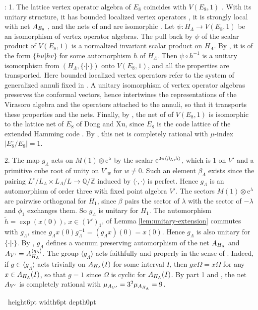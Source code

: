 \documentclass[leqno]{article}
\let\cal\relax
\newcommand{\cal}{\mathcal}
\newcommand{\Z}{\ensuremath{\mathbb{Z}}}
\newcommand{\qed}{\hfill \vrule height6pt  width6pt depth0pt}
\newcommand{\co}{\colon}
\newcommand{\ot}{\otimes}
\let\i\relax %
\newcommand{\i}{\mathrm{i}}
\newcommand{\e}{\mathrm{e}} %
\newenvironment{proof}[1][]{\noindent {\it Proof #1} : }{\hbox{~}\qed
\smallskip
}
\numberwithin{equation}{section}
\begin{document}
\begin{proof}
1. The lattice vertex operator algebra of $E_8$ coincides with $V(E_8,1)$ \cite[Proof of Theorem 7.4 p.~71]{Ten19a}. With its unitary structure, it has bounded localized vertex operators \cite[Theorem 7.4 p.~71]{Ten19a}, it is strongly local with net $\cal A_{E_8}$ \cite[Example 8.7 p.~63]{CKLW18}, and the nets of \cite{Ten19a} and \cite{CKLW18} are isomorphic \cite[Corollary 7.7 p.~72]{Ten19a}. Let $\psi \co H_\Lambda \to V(E_8,1)$ be an isomorphism of vertex operator algebras. The pull back by $\psi$ of the scalar product of $V(E_8,1)$ is a normalized invariant scalar product on $H_\Lambda$. By \cite[Proposition 5.19 p.~40]{CKLW18}, it is of the form $\{hu|hv\}$ for some automorphism $h$ of $H_\Lambda$. Then $\psi \circ h^{-1}$ is a unitary isomorphism from $(H_\Lambda,\{\cdot|\cdot\})$ onto $V(E_8,1)$, and all the properties are transported. Here bounded localized vertex operators refer to the system of generalized annuli fixed in \cite[Section 7]{Ten19a}. A unitary isomorphism of vertex operator algebras preserves the conformal vectors, hence intertwines the representations of the Virasoro algebra and the operators attached to the annuli, so that it transports these properties and the nets. Finally, by \cite[Proposition 7.5 p.~72]{Ten19a}, the net of \cite{Ten19a} of $V(E_8,1)$ is isomorphic to the lattice net of $E_8$ of Dong and Xu, since $E_8$ is the code lattice of the extended Hamming code \cite[Example 7.2 p.~70]{Ten19a}. By \cite[Corollary 3.19 p.~14]{DoX06}, this net is completely rational with $\mu$-index $|E_8^\circ/E_8| = 1$.

2. The map $g_\Lambda$ acts on $M(1) \ot \e^\lambda$ by the scalar $\e^{2\pi\i\langle \beta_\Lambda,\lambda\rangle}$, which is $1$ on $V'$ and a primitive cube root of unity on $V'_w$ for $w \neq 0$. Such an element $\beta_\Lambda$ exists since the pairing $L^\circ/L_\Lambda \times L_\Lambda/L \to \mathbb{Q}/\Z$ induced by $\langle\cdot,\cdot\rangle$ is perfect. Hence $g_\Lambda$ is an automorphism of order three with fixed point algebra $V'$. The sectors $M(1) \ot \e^\lambda$ are pairwise orthogonal for $H_1$, since $\beta$ pairs the sector of $\lambda$ with the sector of $-\lambda$ and $\phi_1$ exchanges them. So $g_\Lambda$ is unitary for $H_1$. The automorphism $\tilde h = \exp(x(0))$, $x \in (V')_1$, of Lemma \ref{lem:unitary-extension} commutes with $g_\Lambda$, since $g_\Lambda x(0)g_\Lambda^{-1} = (g_\Lambda x)(0) = x(0)$. Hence $g_\Lambda$ is also unitary for $\{\cdot|\cdot\}$. By \cite[Theorem 6.9 p.~53 and Proposition 7.6 p.~58]{CKLW18}, $g_\Lambda$ defines a vacuum preserving automorphism of the net $\cal A_{H_\Lambda}$ and $\cal A_{V'} = \cal A_{H_\Lambda}^{\langle g_\Lambda\rangle}$. The group $\langle g_\Lambda\rangle$ acts faithfully and properly in the sense of \cite[Definition 2.1 p.~5]{DoX06}. Indeed, if $g \in \langle g_\Lambda\rangle$ acts trivially on $\cal A_{H_\Lambda}(I)$ for some interval $I$, then $gx\Omega = x\Omega$ for any $x \in \cal A_{H_\Lambda}(I)$, so that $g = 1$ since $\Omega$ is cyclic for $\cal A_{H_\Lambda}(I)$. By part 1 and \cite[Theorem 2.4 p.~6]{DoX06}, the net $\cal A_{V'}$ is completely rational with $\mu_{\cal A_{V'}} = 3^2\mu_{\cal A_{H_\Lambda}} = 9$.


\end{proof}
\end{document}
